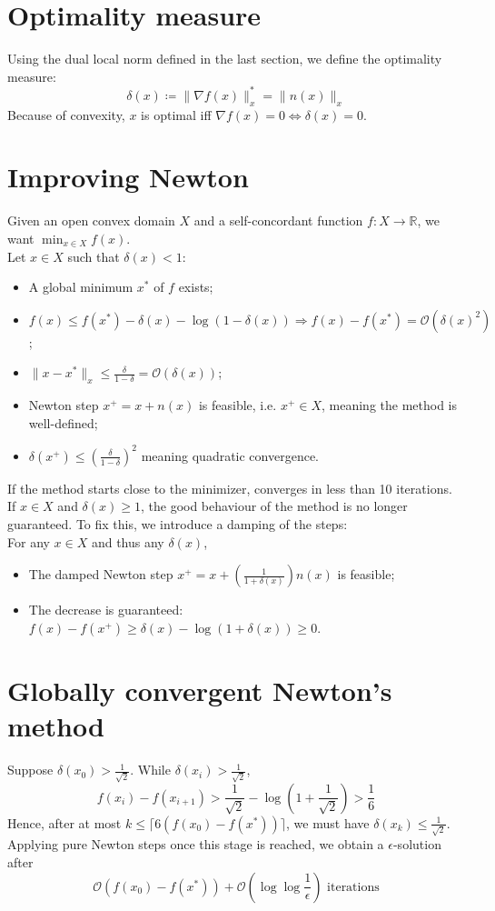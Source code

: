 \documentclass[12pt, openany]{report}
\newcommand{\R}{\mathbb{R}}
\theoremstyle{definition}
\begin{document}
\section{Optimality measure}
Using the dual local norm defined in the last section, we define the optimality measure:
\begin{equation}
    \delta(x)\coloneqq \lVert \nabla f(x)\rVert_x^* = \lVert n(x)\rVert_x
\end{equation}
Because of convexity, $x$ is optimal iff $\nabla f(x) = 0\Longleftrightarrow \delta(x)=0$.
\section{Improving Newton}
Given an open convex domain $X$ and a self-concordant function $f:X\rightarrow \R$, we want $\min_{x\in X} f(x)$.\\
Let $x\in X$ such that $\delta(x)<1$:
\begin{itemize}
    \item A global minimum $x^*$ of $f$ exists;
    \item $f(x)\le f(x^*)-\delta(x) - \log(1-\delta(x)) \Longrightarrow f(x)-f(x^*) =\mathcal{O}(\delta(x)^2)$;
    \item $\lVert x-x^*\rVert_x \le \frac{\delta}{1-\delta} = \mathcal{O}(\delta(x))$;
    \item Newton step $x^+=x+n(x)$ is feasible, i.e. $x^+\in X$, meaning the method is well-defined;
    \item $\delta(x^+)\le \left(\frac{\delta}{1-\delta}\right)^2$ meaning quadratic convergence. 
\end{itemize}
If the method starts close to the minimizer, converges in less than 10 iterations.\\
If $x\in X$ and $\delta(x)\ge 1$, the good behaviour of the method is no longer guaranteed. To fix this, we introduce a damping of the steps:\\

For any $x\in X$ and thus any $\delta(x)$,
\begin{itemize}
    \item The damped Newton step $x^+=x+\left(\frac{1}{1+\delta(x)}\right)n(x)$ is feasible;
    \item The decrease is guaranteed: $f(x)-f(x^+) \ge \delta(x)-\log(1+\delta(x))\ge 0$.
\end{itemize}
\section{Globally convergent Newton's method}
Suppose $\delta(x_0)>\frac{1}{\sqrt{2}}$. While $\delta(x_i)>\frac{1}{\sqrt{2}}$, 
\begin{equation}
    f(x_i)-f(x_{i+1}) > \frac{1}{\sqrt{2}}-\log(1+\frac{1}{\sqrt{2}}) > \frac{1}{6}
\end{equation}
Hence, after at most $k \le \lceil 6(f(x_0)-f(x^*))\rceil$, we must have $\delta(x_k)\le \frac{1}{\sqrt{2}}$. Applying pure Newton steps once this stage is reached, we obtain a $\epsilon$-solution after 
\begin{equation}
    \mathcal{O}(f(x_0)-f(x^*)) + \mathcal{O}(\log \log \frac{1}{\epsilon}) \text{   iterations}
\end{equation}
\end{document}

